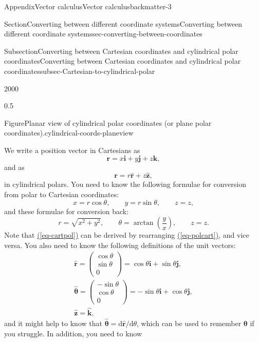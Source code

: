 \documentclass[oneside,10pt,]{book}
\newcommand{\xreffont}{\relax}
\numberwithin{equation}{section}
\newcommand{\de}{\mathrm{d}}
\begin{document}
\begin{appendixptx}{Appendix}{Vector calculus}{}{Vector calculus}{}{}{backmatter-3}
\begin{sectionptx}{Section}{Converting between different coordinate systems}{}{Converting between different coordinate systems}{}{}{sec-converting-between-coordinates}
\begin{subsectionptx}{Subsection}{Converting between Cartesian coordinates and cylindrical polar coordinates}{}{Converting between Cartesian coordinates and cylindrical polar coordinates}{}{}{subsec-Cartesian-to-cylindrical-polar}
\begin{sidebyside}{2}{0}{0}{0}
\begin{sbspanel}{0.5}
\begin{panelfigureptx}{Figure}{Planar view of cylindrical polar coordinates (or plane polar coordinates).}{cylindrical-coords-planeview}{}
\tcblower
\end{panelfigureptx}%
\end{sbspanel}%
\end{sidebyside}%
\par
We write a position vector in Cartesians as%
\begin{equation}
\boldsymbol{r}=x\boldsymbol{i}+y\boldsymbol{j}+z\boldsymbol{k},\label{eq-rcart}
\end{equation}
and as%
\begin{equation}
\boldsymbol{r}=r\hat{\boldsymbol{r}}+z\hat{\boldsymbol{z}},\label{eq-rpol}
\end{equation}
in cylindrical polars. You need to know the following formulae for conversion from polar to Cartesian coordinates:%
\begin{equation}
x=r\cos\theta,\qquad y=r\sin\theta,\qquad z=z,\label{eq-polcart}
\end{equation}
and these formulae for conversion back:%
\begin{equation}
r=\sqrt{x^2+y^2},\qquad \theta=\arctan\left(\frac{y}{x}\right),\qquad z=z.\label{eq-cartpol}
\end{equation}
Note that \hyperref[eq-cartpol]{({\xreffont\ref{eq-cartpol}})} can be derived by rearranging \hyperref[eq-polcart]{({\xreffont\ref{eq-polcart}})}, and vice versa. You also need to know the following definitions of the unit vectors:%
\begin{gather}
\hat{\boldsymbol{r}}=
\left(\begin{matrix}
\cos\theta\\\sin\theta\\0
\end{matrix}\right)
=\cos\theta\boldsymbol{i}+\sin\theta\boldsymbol{j},\label{eq-polarcartunitvectors-r}\\
\hat{\boldsymbol{\theta}}=
\left(\begin{matrix}
-\sin\theta\\\cos\theta\\0
\end{matrix}\right)
=-\sin\theta\boldsymbol{i}+\cos\theta\boldsymbol{j},\label{eq-polarcartunitvectors-theta}\\
\hat{\boldsymbol{z}}=\hat{\boldsymbol{k}},\label{eq-polarcartunitvectors-z}
\end{gather}
and it might help to know that \(\hat{\boldsymbol{\theta}}=\de\hat{\boldsymbol{r}}/\de\theta\), which can be used to remember \(\boldsymbol{\theta}\) if you struggle. In addition, you need to know%
\begin{equation}

\end{equation}
\end{subsectionptx}
\end{sectionptx}
\end{appendixptx}
\end{document}
